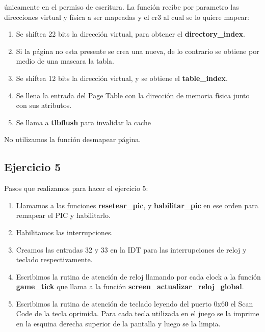 \documentclass[a4paper,10pt]{article}
\begin{document}
\begin{enumerate}
      únicamente en el permiso de escritura. La función recibe por parametro las direcciones virtual y física a ser mapeadas y el cr3 al cual se lo quiere mapear:
      \begin{enumerate}
        \item Se shiftea 22 bits la dirección virtual, para obtener el \textbf{directory\_index}.
        \item Si la página no esta presente se crea una nueva, de lo contrario se obtiene por medio de una mascara la tabla.
        \item Se shiftea 12 bits la dirección virtual, y se obtiene el \textbf{table\_index}.
        \item Se llena la entrada del Page Table con la dirección de memoria física junto con sus atributos.
        \item Se llama a \textbf{tlbflush} para invalidar la cache 
      \end{enumerate}
    
      No utilizamos la función desmapear página.
\end{enumerate}

\newpage

\subsection{Ejercicio 5}
Pasos que realizamos para hacer el ejercicio 5:
\begin{enumerate}
  \item Llamamos a las funciones \textbf{resetear\_pic}, y \textbf{habilitar\_pic} en ese orden para remapear el PIC y habilitarlo. 
  \item Habilitamos las interrupciones.
  \item Creamos las entradas 32 y 33 en la IDT para las interrupciones de reloj y teclado respectivamente. 
  \item Escribimos la rutina de atención de reloj llamando por cada clock a la función \textbf{game\_tick} que llama a la función \textbf{screen\_actualizar\_reloj\_global}.
  \item Escribimos la rutina de atención de teclado leyendo del puerto 0x60 el Scan Code de la tecla oprimida. Para cada tecla utilizada en el juego se la imprime en la esquina derecha superior de la pantalla y luego se la limpia.
\end{enumerate}
\end{document}

